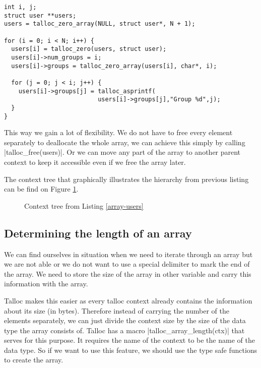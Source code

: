 \begin{lstlisting}[caption={Array of users and context hierarchy},
label={array-users}] int i, j;
struct user **users;
users = talloc_zero_array(NULL, struct user*, N + 1);

for (i = 0; i < N; i++) {
  users[i] = talloc_zero(users, struct user);
  users[i]->num_groups = i;
  users[i]->groups = talloc_zero_array(users[i], char*, i);
  
  for (j = 0; j < i; j++) {
    users[i]->groups[j] = talloc_asprintf(
                          users[i]->groups[j],"Group %d",j);
  }
}
\end{lstlisting}

This way we gain a lot of flexibility. We do not have to free every element
separately to deallocate the whole array, we can achieve this simply by calling
|talloc_free(users)|. Or we can move any part of the array to another parent
context to keep it accessible even if we free the array later.

The context tree that graphically illustrates the hierarchy from previous
listing can be find on Figure \ref{fig:context-tree-array}.

\begin{figure}[H]
  \centering
  
  \caption{Context tree from Listing \ref{array-users}}
  \label{fig:context-tree-array}
\end{figure}

\subsection{Determining the length of an array}

We can find ourselves in situation when we need to iterate through an array but
we are not able or we do not want to use a special delimiter to mark the end of
the array. We need to store the size of the array in other variable and carry
this information with the array.

Talloc makes this easier as every talloc context already contains the
information about its size (in bytes). Therefore instead of carrying the number
of the elements separately, we can just divide the context size by the size of
the data type the array consists of. Talloc has a macro
|talloc_array_length(ctx)| that serves for this purpose. It requires the name of
the context to be the name of the data type. So if we want to use this feature,
we should use the type safe functions to create the array.

